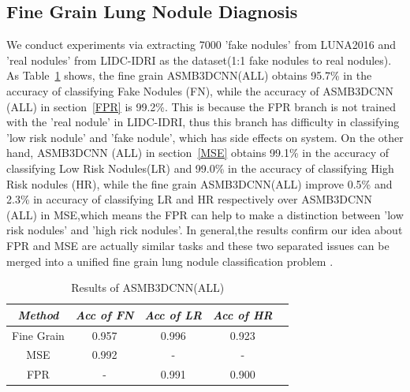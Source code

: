 \documentclass[runningheads]{llncs}
\begin{document}
\subsection{Fine Grain Lung Nodule Diagnosis}
We conduct experiments via extracting 7000 'fake nodules' from LUNA2016 and 'real nodules' from LIDC-IDRI as the dataset(1:1 fake nodules to real nodules).
As Table~\ref{tab6} shows, the fine grain ASMB3DCNN(ALL) obtains 95.7\% in the accuracy of classifying Fake Nodules (FN), while the accuracy of ASMB3DCNN (ALL) in section~\ref{FPR} is 99.2\%. This is because the FPR branch is not trained with the 'real nodule' in LIDC-IDRI, thus this branch has difficulty in classifying 'low risk nodule' and 'fake nodule', which has side effects on system.
On the other hand, ASMB3DCNN (ALL) in section~\ref{MSE} obtains 99.1\% in the accuracy of classifying Low Risk Nodules(LR) and 99.0\% in the accuracy of classifying High Risk nodules (HR), while the fine grain ASMB3DCNN(ALL) improve 0.5\% and 2.3\% in accuracy of classifying LR and HR respectively over ASMB3DCNN (ALL) in MSE,which means the FPR can help to make a distinction between 'low risk nodules' and 'high rick nodules'.
In general,the results confirm our idea about FPR and MSE are actually similar tasks and these two separated issues can be merged into a unified fine grain lung nodule classification problem .

\begin{table}[htb]
\vspace{-0.5cm}
\caption{Results of ASMB3DCNN(ALL)}
\vspace{-0.5cm}
\begin{center}
\begin{tabular}{|c|c|c|c|c|}
\hline
\textbf{\textit{Method}}& \textbf{\textit{Acc of FN}}& \textbf{\textit{Acc of LR}}& \textbf{\textit{Acc of HR}}  \\
\hline
Fine Grain & 0.957 & 0.996 & 0.923\\
MSE  & 0.992 & - & -\\
FPR & - & 0.991 &0.900 \\
\hline
\end{tabular}
\vspace{-0.5cm}
\label{tab6}
\end{center}
\vspace{-0.5cm}
\end{table}
\end{document}
